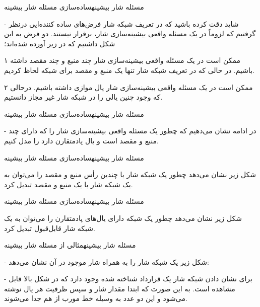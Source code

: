 \begin{itemframe}{مسئله شار بیشینه}{ساده‌سازی مسئله شار بیشینه}
\item[-]
شاید دقت کرده باشید که در تعریف شبکه شار فرض‌های ساده کننده‌ایی درنظر گرفتیم که لزوماً در یک مسئله واقعی بیشینه‌سازی شار، برقرار نیستند. دو فرض به این شکل داشتیم که در زیر آورده شده‌اند؛
\item[۱]
ممکن است در یک مسئله واقعی بیشینه‌سازی شار چند منبع و چند مقصد داشته باشیم. در حالی که در تعریف شبکه شار تنها یک منبع و مقصد برای شبکه لحاظ کردیم.
\item[۲]
ممکن است در یک مسئله واقعی بیشینه‌سازی شار یال موازی داشته باشیم. درحالی که وجود چنین یالی را در شبکه شار غیر مجاز دانستیم.
\end{itemframe}

\begin{itemframe}{مسئله شار بیشینه}{ساده‌سازی مسئله شار بیشینه}
\item[-]
در ادامه نشان می‌دهیم که چطور یک مسئله واقعی بیشینه‌سازی شار را که دارای چند منبع و مقصد است و یال پادمتقارن دارد را مدل کنیم.

\end{itemframe}

\begin{itemframe}{مسئله شار بیشینه}{ساده‌سازی مسئله شار بیشینه}
\item
شکل زیر نشان می‌دهد چطور یک شبکه شار با چندین رأس منبع و مقصد را می‌توان به یک شبکه شار با یک منبع و مقصد تبدیل کرد.

\end{itemframe}

\begin{itemframe}{مسئله شار بیشینه}{ساده‌سازی مسئله شار بیشینه}
\item
شکل زیر نشان می‌دهد چطور یک شبکه دارای یال‌های پادمتقارن را می‌توان به یک شبکه شار قابل‌قبول تبدیل کرد.
\end{itemframe}
\begin{itemframe}{مسئله شار بیشینه}{مثالی از مسئله شار بیشینه}
\item[-]
شکل زیر یک شبکه شار را به همراه شار موجود در آن نشان می‌دهد:

\item[-]
برای نشان دادن شبکه شار یک قرارداد شناخته شده وجود دارد که در شکل بالا قابل مشاهده است. به این صورت که ابتدا مقدار شار و سپس ظرفیت هر یال نوشته می‌شود و این دو عدد به وسیله خط مورب از هم جدا می‌شوند.
\end{itemframe}

